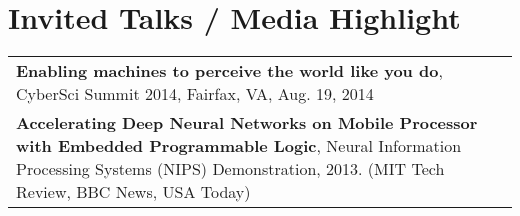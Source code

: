 \documentclass[11pt]{article}
\begin{document}
\section*{Invited Talks / Media Highlight}
\begin{tabular}{L{\textwidth}}
  {\bf Enabling machines to perceive the world like you do}, CyberSci Summit 2014, Fairfax, VA, Aug. 19, 2014 \\ [5pt]
  {\bf Accelerating Deep Neural Networks on Mobile Processor with Embedded Programmable Logic}, Neural Information Processing Systems (NIPS) Demonstration, 2013. (MIT Tech Review, BBC News, USA Today)
\end{tabular}
\vspace{-10pt}


\begin{comment}
\section*{Relevant Courses}
\begin{tabular}{L{0.74\textwidth} R{0.2\textwidth}}
  ECE 580  - Optimization Methods for Systems and Control                          & Spring 2015 \\ [0pt]
  ECE 629  - Introduction to Neural Networks                                       & Fall 2014 \\ [0pt]
  ECE 570  - Artificial Intelligence                                               & Fall 2014 \\ [0pt]
  ECE 662  - Pattern Recognition and Decision Process                              & Spring 2014 \\ [0pt]
  CS 578   - Statistical Machine Learning                                          & Fall 2013 \\ [0pt]
  STAT 528 - Introduction to Statistical Methods                                   & Fall 2013 \\ [0pt]
  ECE 608  - Computational Models and Methods                                      & Spring 2013 \\ [0pt]
  IE 690   - Gesture and Body Interaction Systems                                  & Spring 2013 \\ [0pt]
  ECE 695  - System-on-Chip Design                                                 & Fall 2012 \\ [0pt]
  BME 595  - Neuromorphic Systems and Vision                                       & Spring 2012 \\ [0pt]
  ECE 600  - Random Variables                                                      & Fall 2011 \\ [0pt]
\end{tabular}
\end{comment}
\end{document}
